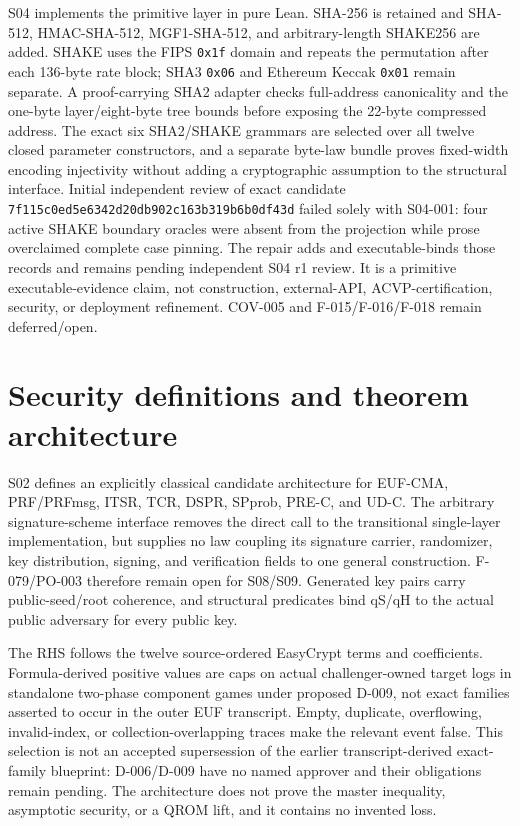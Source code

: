 \documentclass[11pt]{article}
\begin{document}
S04 implements the primitive layer in pure Lean. SHA-256 is retained and SHA-512,
HMAC-SHA-512, MGF1-SHA-512, and arbitrary-length SHAKE256 are added. SHAKE uses the FIPS
\texttt{0x1f} domain and repeats the permutation after each 136-byte rate block; SHA3
\texttt{0x06} and Ethereum Keccak \texttt{0x01} remain separate. A proof-carrying SHA2 adapter
checks full-address canonicality and the one-byte layer/eight-byte tree bounds before exposing the
22-byte compressed address. The exact six SHA2/SHAKE grammars are selected over all twelve closed
parameter constructors, and a separate byte-law bundle proves fixed-width encoding injectivity
without adding a cryptographic assumption to the structural interface. Initial independent review
of exact candidate
\texttt{7f115c0ed5e6342d20db902c163b319b6b0df43d} failed solely with S04-001: four active SHAKE
boundary oracles were absent from the projection while prose overclaimed complete case pinning.
The repair adds and executable-binds those records and remains pending independent S04 r1 review.
It is a primitive executable-evidence claim, not construction,
external-API, ACVP-certification, security, or deployment refinement. COV-005 and
F-015/F-016/F-018 remain deferred/open.

\section{Security definitions and theorem architecture}
S02 defines an explicitly classical candidate architecture for EUF-CMA, PRF/PRFmsg, ITSR, TCR,
DSPR, SPprob, PRE-C, and UD-C. The arbitrary signature-scheme interface removes the direct call to
the transitional single-layer implementation, but supplies no law coupling its signature carrier,
randomizer, key distribution, signing, and verification fields to one general construction.
F-079/PO-003 therefore remain open for S08/S09. Generated key pairs carry public-seed/root
coherence, and structural predicates bind qS/qH to the actual public adversary for every public key.

The RHS follows the twelve source-ordered EasyCrypt terms and coefficients. Formula-derived
positive values are caps on actual challenger-owned target logs in standalone two-phase component
games under proposed D-009, not exact families asserted to occur in the outer EUF transcript. Empty, duplicate,
overflowing, invalid-index, or collection-overlapping traces make the relevant event false. This
selection is not an accepted supersession of the earlier transcript-derived exact-family blueprint:
D-006/D-009 have no named approver and their obligations remain pending. The architecture does not
prove the master inequality, asymptotic security, or a QROM lift, and it contains no invented loss.
\end{document}
